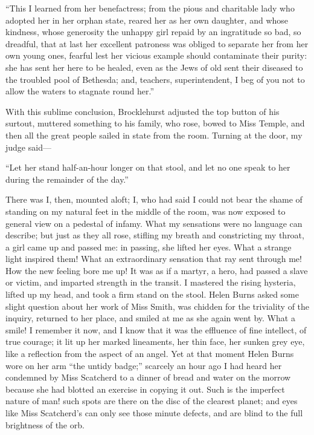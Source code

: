 \enquote{This I learned from her benefactress; from the pious and
charitable lady who adopted her in her orphan state, reared her as her
own daughter, and whose kindness, whose generosity the unhappy girl
repaid by an ingratitude so bad, so dreadful, that at last her excellent
patroness was obliged to separate her from her own young ones, fearful
lest her vicious example should contaminate their purity: she has sent
her here to be healed, even as the Jews of old sent their diseased to
the troubled pool of Bethesda; and, teachers, superintendent, I beg of
you not to allow the waters to stagnate round her.}

With this sublime conclusion, \Mr{} Brocklehurst adjusted the top button
of his surtout, muttered something to his family, who rose, bowed to
Miss Temple, and then all the great people sailed in state from the
room. Turning at the door, my judge said---

\enquote{Let her stand half-an-hour longer on that stool, and let no one
speak to her during the remainder of the day.}

There was I, then, mounted aloft; I, who had said I could not bear the
shame of standing on my natural feet in the middle of the room, was now
exposed to general view on a pedestal of infamy. What my sensations
were no language can describe; but just as they all rose, stifling my
breath and constricting my throat, a girl came up and passed me: in
passing, she lifted her eyes. What a strange light inspired them! What
an extraordinary sensation that ray sent through me! How the new
feeling bore me up! It was as if a martyr, a hero, had passed a slave
or victim, and imparted strength in the transit. I mastered the rising
hysteria, lifted up my head, and took a firm stand on the stool. Helen
Burns asked some slight question about her work of Miss Smith, was
chidden for the triviality of the inquiry, returned to her place, and
smiled at me as she again went by. What a smile! I remember it now,
and I know that it was the effluence of fine intellect, of true courage;
it lit up her marked lineaments, her thin face, her sunken grey eye,
like a reflection from the aspect of an angel. Yet at that moment Helen
Burns wore on her arm \enquote{the untidy badge;} scarcely an hour ago I
had heard her condemned by Miss Scatcherd to a dinner of bread and water
on the morrow because she had blotted an exercise in copying it out. 
Such is the imperfect nature of man! such spots are there on the disc of
the clearest planet; and eyes like Miss Scatcherd's can only see those
minute defects, and are blind to the full brightness of the orb.

